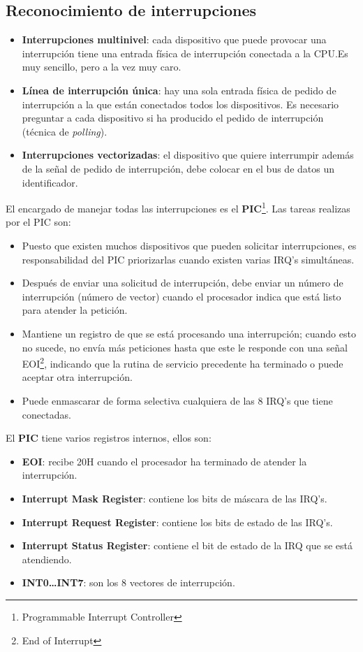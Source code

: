 \subsection{Reconocimiento de interrupciones}

\begin{itemize}
  \item \textbf{Interrupciones multinivel}: cada dispositivo que puede provocar una interrupción tiene una entrada física de interrupción conectada a la CPU.\@ Es muy sencillo, pero a la vez muy caro.
  \item \textbf{Línea de interrupción única}: hay una sola entrada física de pedido de interrupción a la que están conectados todos los dispositivos. Es necesario preguntar a cada dispositivo si ha producido el pedido de interrupción (técnica de \textit{polling}).
  \item \textbf{Interrupciones vectorizadas}: el dispositivo que quiere interrumpir además de la señal de pedido de interrupción, debe colocar en el bus de datos un identificador.
\end{itemize}

El encargado de manejar todas las interrupciones es el \textbf{PIC}\footnote{Programmable Interrupt Controller}. Las tareas realizas por el PIC son:

\begin{itemize}
  \item Puesto que existen muchos dispositivos que pueden solicitar interrupciones, es responsabilidad del PIC priorizarlas cuando existen varias IRQ's simultáneas.
  \item Después de enviar una solicitud de interrupción, debe enviar un número de interrupción (número de vector) cuando el procesador indica que está listo para atender la petición.
  \item Mantiene un registro de que se está procesando una interrupción; cuando esto no sucede, no envía más peticiones hasta que este le responde con una señal EOI\footnote{End of Interrupt}, indicando que la rutina de servicio precedente ha terminado o puede aceptar otra interrupción.
  \item Puede enmascarar de forma selectiva cualquiera de las 8 IRQ's que tiene conectadas.
\end{itemize}

El \textbf{PIC} tiene varios registros internos, ellos son:

\begin{itemize}
  \item \textbf{EOI}: recibe 20H cuando el procesador ha terminado de atender la interrupción.
  \item \textbf{Interrupt Mask Register}: contiene los bits de máscara de las IRQ's.
  \item \textbf{Interrupt Request Register}: contiene los bits de estado de las IRQ's.
  \item \textbf{Interrupt Status Register}: contiene el bit de estado de la IRQ que se está atendiendo.
  \item \textbf{INT0\ldots INT7}: son los 8 vectores de interrupción.
\end{itemize}